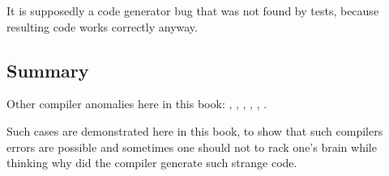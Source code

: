 It is supposedly a code generator bug that was not found by tests, because 
resulting code works correctly anyway.



\subsection{Summary}

Other compiler anomalies here in this book: 
, , ,
,
,
.

Such cases are demonstrated here in this book, to show that such compilers errors are possible and sometimes
one should not to rack one's brain while thinking why did the compiler generate such strange code.


